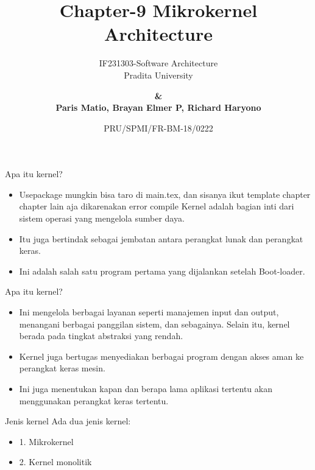 \documentclass[aspectratio=169, table]{beamer}
\subtitle{IF231303-Software Architecture\\Pradita University}
\title{\vskip-0.7cm \Large Chapter-9 Mikrokernel Architecture}
\date[Serial]{\scriptsize {PRU/SPMI/FR-BM-18/0222}}
\author[Pradita]{\small {\textbf{\&\\ Paris Matio, Brayan Elmer P, Richard Haryono}}}
\begin{document}
	

	\begin{frame}[plain]
		\maketitle
	\end{frame}
	
	\begin{frame}{Apa itu kernel?}
		\begin{itemize}
			\item Usepackage mungkin bisa taro di main.tex, dan sisanya ikut template chapter chapter lain aja dikarenakan error compile
			Kernel adalah bagian inti dari sistem operasi yang mengelola sumber daya. 
			
			
			\item Itu juga bertindak sebagai jembatan antara perangkat lunak dan perangkat keras. 
			
			\item Ini adalah salah satu program pertama yang dijalankan setelah Boot-loader.
			
		
		\end{itemize}
	\end{frame}	


	\begin{frame}{Apa itu kernel?}
	\begin{itemize}
		
		
		\item Ini mengelola berbagai layanan seperti manajemen input dan output, menangani berbagai panggilan sistem, dan sebagainya. Selain itu, kernel berada pada tingkat abstraksi yang rendah.
		
		\item Kernel juga bertugas menyediakan berbagai program dengan akses aman ke perangkat keras mesin. 
		
		\item Ini juga menentukan kapan dan berapa lama aplikasi tertentu akan menggunakan perangkat keras tertentu.
	\end{itemize}
\end{frame}	
	
	\begin{frame}{Jenis kernel}
		Ada dua jenis kernel:
		\begin{itemize}
			\item 	1. Mikrokernel
			\item	2. Kernel monolitik
		\end{itemize}
		
	\end{frame}
	
\end{document}
